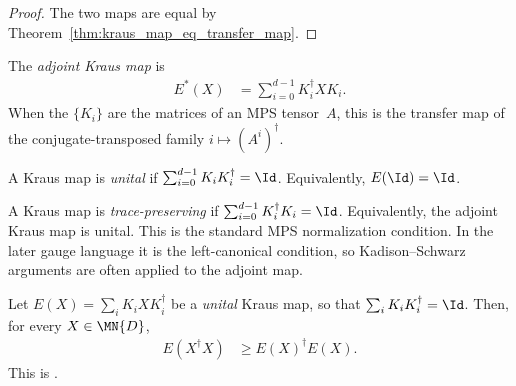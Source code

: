 \begin{proof}
    \leanok
    The two maps are equal by
    Theorem~\ref{thm:kraus_map_eq_transfer_map}.
\end{proof}

\begin{definition}\label{def:kraus_adjoint_map}
    \leanok
    The \emph{adjoint Kraus map} is
    \begin{align}
        E^*(X)
        &= \sum_{i=0}^{d-1} K_i^\dagger X K_i.
        \label{eq:schwarz_kraus_adjoint}
    \end{align}
    When the $\{K_i\}$ are the matrices of an MPS tensor~$A$,
    this is the transfer map of the conjugate-transposed family
    $i \mapsto (A^i)^\dagger$.
\end{definition}

\begin{definition}\label{def:unital_kraus}
    \leanok
    A Kraus map is \emph{unital} if
    $\sum_{i=0}^{d-1} K_i K_i^\dagger = \Id$.
    Equivalently, $E(\Id) = \Id$.
\end{definition}

\begin{definition}\label{def:tp_kraus}
    \leanok
    A Kraus map is \emph{trace-preserving} if
    $\sum_{i=0}^{d-1} K_i^\dagger K_i = \Id$.
    Equivalently, the adjoint Kraus map is unital.
    This is the standard MPS normalization condition.
    In the later gauge language it is the left-canonical condition,
    so Kadison--Schwarz arguments are often applied to the adjoint map.
\end{definition}

\begin{theorem}\label{thm:kadison_schwarz}
    \leanok
    Let $E(X) = \sum_i K_i X K_i^\dagger$ be a \emph{unital}
    Kraus map, so that $\sum_i K_i K_i^\dagger = \Id$.
    Then, for every $X \in \MN{D}$,
    \begin{align}
        E(X^\dagger X)
        &\geq E(X)^\dagger E(X).
        \label{eq:schwarz_kadison}
    \end{align}
    This is \cite[Equation~(5.2)]{Wolf2012Quantum}.
\end{theorem}

